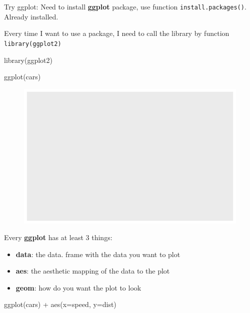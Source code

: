 \documentclass[
  letterpaper,
  DIV=11,
  numbers=noendperiod]{scrartcl}
\newenvironment{Shaded}{\begin{snugshade}}{\end{snugshade}}
\newcommand{\AttributeTok}[1]{\textcolor[rgb]{0.40,0.45,0.13}{#1}}
\newcommand{\FunctionTok}[1]{\textcolor[rgb]{0.28,0.35,0.67}{#1}}
\newcommand{\NormalTok}[1]{\textcolor[rgb]{0.00,0.23,0.31}{#1}}
\newcommand{\SpecialCharTok}[1]{\textcolor[rgb]{0.37,0.37,0.37}{#1}}
\providecommand{\tightlist}{%
  \setlength{\itemsep}{0pt}\setlength{\parskip}{0pt}}\usepackage{longtable,booktabs,array}
\begin{document}
Try ggplot: Need to install \textbf{ggplot} package, use function
\texttt{install.packages()}. Already installed.

Every time I want to use a package, I need to call the library by
function \texttt{library(ggplot2)}

\begin{Shaded}
\begin{Highlighting}[]
\FunctionTok{library}\NormalTok{(ggplot2)}

\FunctionTok{ggplot}\NormalTok{(cars)}
\end{Highlighting}
\end{Shaded}

\begin{figure}[H]

{\centering \includegraphics{class05_files/figure-pdf/unnamed-chunk-2-1.pdf}

}

\end{figure}

Every \textbf{ggplot} has at least 3 things:

\begin{itemize}
\tightlist
\item
  \textbf{data}: the data. frame with the data you want to plot
\item
  \textbf{aes}: the aesthetic mapping of the data to the plot
\item
  \textbf{geom}: how do you want the plot to look
\end{itemize}

\begin{Shaded}
\begin{Highlighting}[]
\FunctionTok{ggplot}\NormalTok{(cars) }\SpecialCharTok{+}
  \FunctionTok{aes}\NormalTok{(}\AttributeTok{x=}\NormalTok{speed, }\AttributeTok{y=}\NormalTok{dist)}
\end{Highlighting}
\end{Shaded}
\end{document}
